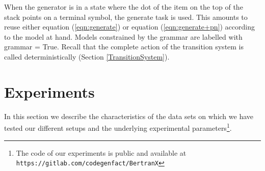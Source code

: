 \documentclass[11pt]{article}
\newcommand{\comment}[1]{}
\newcommand{\var}{\sc}
\begin{document}
When the generator is in a state where the dot of the item on the top of the stack points on a terminal symbol, the generate task is used.
This amounts to reuse either equation (\ref{eqn:generate}) or equation (\ref{eqn:generate+pn}) according to the model at hand. Models constrained by the grammar are labelled with  {\var grammar = True}. 
Recall that the {\sc complete} action of the transition system is called deterministically (Section \ref{TransitionSystem}).






\comment{
\subsubsection{Action Probabilities}

{\sl comment on grammatical constraints;  pointer network }

The attentional vector  is the key to compute the next derivation's action. \\
\textbf{\texttt{PREDICT} case} The probability of using rule r as the current action  is given by softmax:


where each row of  is embedding matrix for \texttt{PREDICT} and e(r) is the one-hot vector for rule r. \\
\textbf{\texttt{GENERATE} case} As explained in \nameref{Code Generation}, a new token  can be generated from an external vocabulary or copied from the input. Then the probability of generating  is given by the marginal probability:

{\sl distinguer le cas où on utilise le PN et la cas où on l'utilise pas}

Here, the probabilities p(gen|.) and p(copy|.) are computed with . The probability of generating v from an external vocabulary  is defined in the same way as \ref{eqn:applyrule} (with  as embedding matrix for \texttt{GENERATE}). We use the pointer net architecture \cite{Pointernet} to compute the probability  of copying an element from the natural language .}


\section{Experiments} 
\label{Experiments}

In this section we describe the characteristics of the data sets on which we have tested our different setups and the underlying experimental parameters\footnote{The code of our experiments is public and available at {\tt https://gitlab.com/codegenfact/BertranX}}. 
\end{document}
